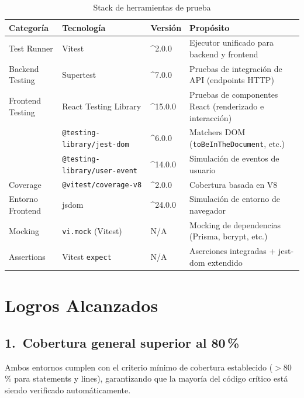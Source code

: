 \documentclass[12pt, a4paper]{article}
\begin{document}
\begin{table}[H]
\centering
\renewcommand{\arraystretch}{1.4}
\begin{tabularx}{\linewidth}{llp{2.2cm}X}
\toprule
\rowcolor{lightblue}
\textbf{Categoría} & \textbf{Tecnología} & \textbf{Versión} & \textbf{Propósito} \\
\midrule
Test Runner       & Vitest                             & \^{}2.0.0  & Ejecutor unificado para backend y frontend \\
Backend Testing   & Supertest                          & \^{}7.0.0  & Pruebas de integración de API (endpoints HTTP) \\
Frontend Testing  & React Testing Library              & \^{}15.0.0 & Pruebas de componentes React (renderizado e interacción) \\
                  & \texttt{@testing-library/jest-dom} & \^{}6.0.0  & Matchers DOM (\texttt{toBeInTheDocument}, etc.) \\
                  & \texttt{@testing-library/user-event} & \^{}14.0.0 & Simulación de eventos de usuario \\
Coverage          & \texttt{@vitest/coverage-v8}       & \^{}2.0.0  & Cobertura basada en V8 \\
Entorno Frontend  & jsdom                              & \^{}24.0.0 & Simulación de entorno de navegador \\
Mocking           & \texttt{vi.mock} (Vitest)          & N/A        & Mocking de dependencias (Prisma, bcrypt, etc.) \\
Assertions        & Vitest \texttt{expect}             & N/A        & Aserciones integradas + jest-dom extendido \\
\bottomrule
\end{tabularx}
\caption{Stack de herramientas de prueba}
\end{table}

\section{Logros Alcanzados}

\subsection{1.\ Cobertura general superior al 80\,\%}

\begin{logrobox}
Ambos entornos cumplen con el criterio mínimo de cobertura establecido
($>$80\,\% para statements y lines), garantizando que la mayoría del código
crítico está siendo verificado automáticamente.
\end{logrobox}
\end{document}
